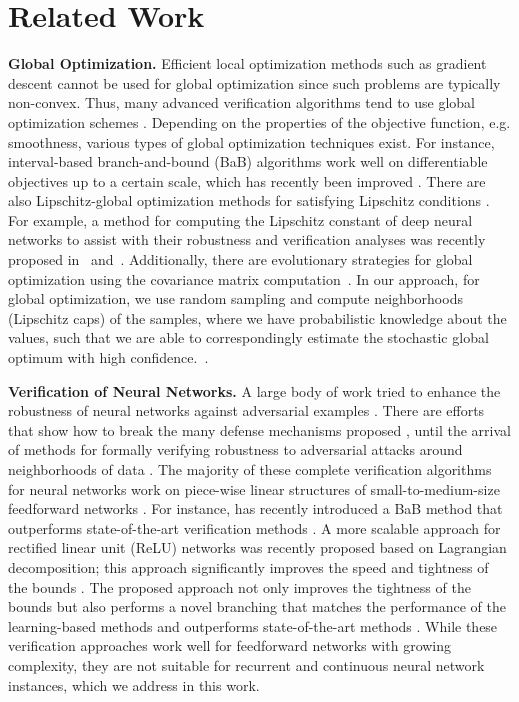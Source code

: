 \documentclass[letterpaper]{article} %
\begin{document}
\section{Related Work}
\textbf{Global Optimization.} Efficient local optimization methods such as gradient descent cannot be used for global optimization since such problems are typically non-convex. Thus, many advanced verification algorithms tend to use global optimization schemes \cite{NEURIPS2018_be53d253,bunel2020lagrangian}. Depending on the properties of the objective function, e.g. smoothness, various types of global optimization techniques exist. For instance, interval-based branch-and-bound (BaB) algorithms \cite{neumaier_2004,hansen2003global} work well on differentiable objectives up to a certain scale, which has recently been improved \cite{de2021improved}. There are also Lipschitz-global optimization methods for satisfying Lipschitz conditions \cite{Lipschitz,kvasov2013Lipschitz}. For example, a method for computing the Lipschitz constant of deep neural networks to assist with their robustness and verification analyses was recently proposed in~\cite{NEURIPS2019_95e1533e} and~\cite{bhowmick2021lipbab}. Additionally, there are evolutionary strategies for global optimization using the covariance matrix computation~\cite{cma,cmaes}. In our approach, for global optimization, we use random sampling and compute neighborhoods (Lipschitz caps) of the samples, where we have probabilistic knowledge about the values, such that we are able to correspondingly estimate the stochastic global optimum with high confidence.~\cite{stochGlobOptim}.

\noindent\textbf{Verification of Neural Networks.}
A large body of work tried to enhance the robustness of neural networks against adversarial examples \cite{goodfellow2014explaining}. There are efforts that show how to break the many defense mechanisms proposed \cite{athalye2018obfuscated,lechner2021adversarial}, until the arrival of methods for formally verifying robustness to adversarial attacks around neighborhoods of data \cite{henzinger2021scalable}. 
The majority of these complete verification algorithms for neural networks work on piece-wise linear structures of small-to-medium-size feedforward networks \cite{NEURIPS2019_246a3c55}. For instance, \cite{bunel2020branch} has recently introduced a BaB method that outperforms state-of-the-art verification methods \cite{katz2017reluplex,NEURIPS2020_f6c2a0c4}. A more scalable approach for rectified linear unit (ReLU) networks \cite{nair2010rectified} was recently proposed based on Lagrangian decomposition; this approach significantly improves the speed and tightness of the bounds \cite{de2021improved}. The proposed approach not only improves the tightness of the bounds but also performs a novel branching that matches the performance of the learning-based methods \cite{lu2020nueral} and outperforms state-of-the-art methods \cite{NEURIPS2018_d04863f1,singheth,bak2020improved,henriksen2020efficient}. While these verification approaches work well for feedforward networks with growing complexity, they are not suitable for recurrent and continuous neural network instances, which we address in this work. 
\end{document}
